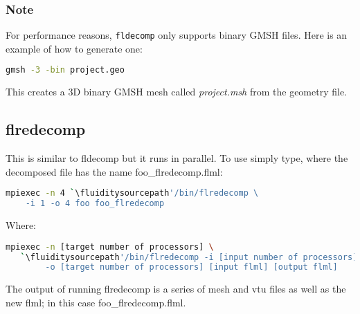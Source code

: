 
\subsubsection*{Note} For performance reasons, \lstinline[language=Bash]{fldecomp} only supports binary GMSH files. Here is an example of how to generate one:

\begin{lstlisting}[language=bash]
gmsh -3 -bin project.geo
\end{lstlisting}

This creates a 3D binary GMSH mesh called \textit{project.msh} from the geometry file.



\subsection{flredecomp}
\label{mesh!meshing tools!flredecomp}
This is similar to fldecomp but it runs in parallel. To use simply type, where the decomposed file has the
name foo\_flredecomp.flml:

\begin{lstlisting}[language=bash]
mpiexec -n 4 `\fluiditysourcepath'/bin/flredecomp \
    -i 1 -o 4 foo foo_flredecomp
\end{lstlisting}

Where:

\begin{lstlisting}[language=bash]
mpiexec -n [target number of processors] \
   `\fluiditysourcepath'/bin/flredecomp -i [input number of processors] \
        -o [target number of processors] [input flml] [output flml]
\end{lstlisting}

The output of running flredecomp is a series of mesh and vtu files as well as the new flml; in this case foo\_flredecomp.flml.

